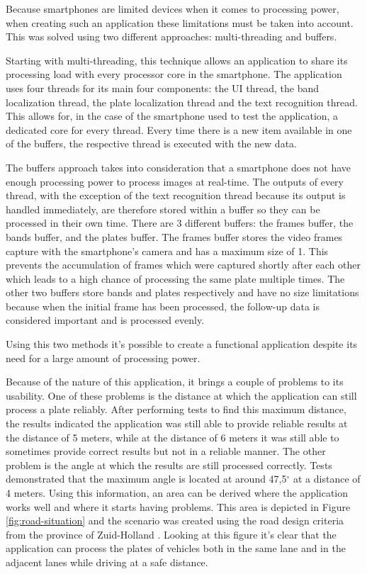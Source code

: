 Because smartphones are limited devices when it comes to processing power, when creating such an application these limitations must be taken into account. This was solved using two different approaches: multi-threading and buffers.

Starting with multi-threading, this technique allows an application to share its processing load with every processor core in the smartphone. The application uses four threads for its main four components: the UI thread, the band localization thread, the plate localization thread and the text recognition thread. This allows for, in the case of the smartphone used to test the application, a dedicated core for every thread. Every time there is a new item available in one of the buffers, the respective thread is executed with the new data.

The buffers approach takes into consideration that a smartphone does not have enough processing power to process images at real-time. The outputs of every thread, with the exception of the text recognition thread because its output is handled immediately, are therefore stored within a buffer so they can be processed in their own time. There are 3 different buffers: the frames buffer, the bands buffer, and the plates buffer. 
The frames buffer stores the video frames capture with the smartphone's camera and has a maximum size of 1. This prevents the accumulation of frames which were captured shortly after each other which leads to a high chance of processing the same plate multiple times. The other two buffers store bands and plates respectively and have no size limitations because when the initial frame has been processed, the follow-up data is considered important and is processed evenly.

Using this two methods it's possible to create a functional application despite its need for a large amount of processing power.



Because of the nature of this application, it brings a couple of problems to its usability. One of these problems is the distance at which the application can still process a plate reliably. After performing tests to find this maximum distance, the results indicated the application was still able to provide reliable results at the distance of 5 meters, while at the distance of 6 meters it was still able to sometimes provide correct results but not in a reliable manner. The other problem is the angle at which the results are still processed correctly. Tests demonstrated that the maximum angle is located at around 47,5$^{\circ}$ at a distance of 4 meters. Using this information, an area can be derived where the application works well and where it starts having problems. This area is depicted in Figure \ref{fig:road-situation} and the scenario was created using the road design criteria from the province of Zuid-Holland \cite{road-design}. Looking at this figure it's clear that the application can process the plates of vehicles both in the same lane and in the adjacent lanes while driving at a safe distance.


